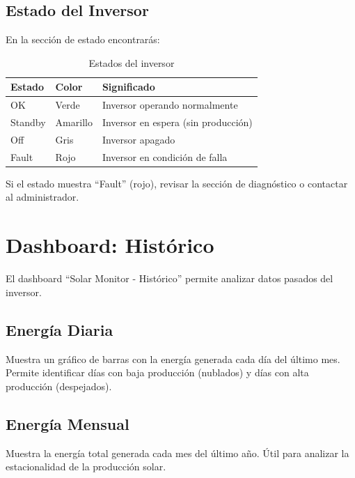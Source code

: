\documentclass[12pt,a4paper]{article}
\begin{document}
\subsection{Estado del Inversor}

En la secci\'on de estado encontrar\'as:

\begin{table}[H]
\centering
\begin{tabular}{lll}
\toprule
\textbf{Estado} & \textbf{Color} & \textbf{Significado} \\
\midrule
OK & Verde & Inversor operando normalmente \\
Standby & Amarillo & Inversor en espera (sin producci\'on) \\
Off & Gris & Inversor apagado \\
Fault & Rojo & Inversor en condici\'on de falla \\
\bottomrule
\end{tabular}
\caption{Estados del inversor}
\end{table}

\begin{warnbox}
Si el estado muestra ``Fault'' (rojo), revisar la secci\'on de diagn\'ostico o contactar al administrador.
\end{warnbox}

\section{Dashboard: Hist\'orico}

El dashboard ``Solar Monitor - Hist\'orico'' permite analizar datos pasados del inversor.

\subsection{Energ\'ia Diaria}

Muestra un gr\'afico de barras con la energ\'ia generada cada d\'ia del \'ultimo mes. Permite identificar d\'ias con baja producci\'on (nublados) y d\'ias con alta producci\'on (despejados).

\subsection{Energ\'ia Mensual}

Muestra la energ\'ia total generada cada mes del \'ultimo a\~no. \'Util para analizar la estacionalidad de la producci\'on solar.
\end{document}
